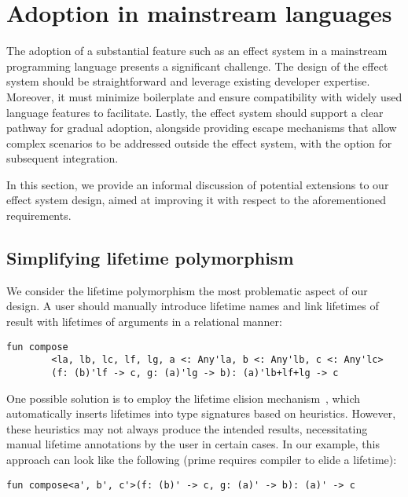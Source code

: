 \documentclass[acmsmall,review,screen]{acmart}
\begin{document}




\section{Adoption in mainstream languages} \label{sec:mainstream}

The adoption of a substantial feature such as an effect system in a mainstream programming language presents a significant challenge.
The design of the effect system should be straightforward and leverage existing developer expertise.
Moreover, it must minimize boilerplate and ensure compatibility with widely used language features to facilitate.
Lastly, the effect system should support a clear pathway for gradual adoption, alongside providing escape mechanisms that allow complex scenarios to be addressed outside the effect system, with the option for subsequent integration.

In this section, we provide an informal discussion of potential extensions to our effect system design, aimed at improving it with respect to the aforementioned requirements.

\subsection{Simplifying lifetime polymorphism} \label{subsec:lifetime-poly-enhancement}

We consider the lifetime polymorphism the most problematic aspect of our design.
A user should manually introduce lifetime names and link lifetimes of result with lifetimes of arguments in a relational manner:
\begin{lstlisting}[language=colang]
    fun compose
        <la, lb, lc, lf, lg, a <: Any'la, b <: Any'lb, c <: Any'lc>
        (f: (b)'lf -> c, g: (a)'lg -> b): (a)'lb+lf+lg -> c
\end{lstlisting}

One possible solution is to employ the lifetime elision mechanism~\cite{matsakis2014rust}, which automatically inserts lifetimes into type signatures based on heuristics.
However, these heuristics may not always produce the intended results, necessitating manual lifetime annotations by the user in certain cases.
In our example, this approach can look like the following (prime requires compiler to elide a lifetime):
\begin{lstlisting}[language=colang]
    fun compose<a', b', c'>(f: (b)' -> c, g: (a)' -> b): (a)' -> c
\end{lstlisting}
\end{document}
